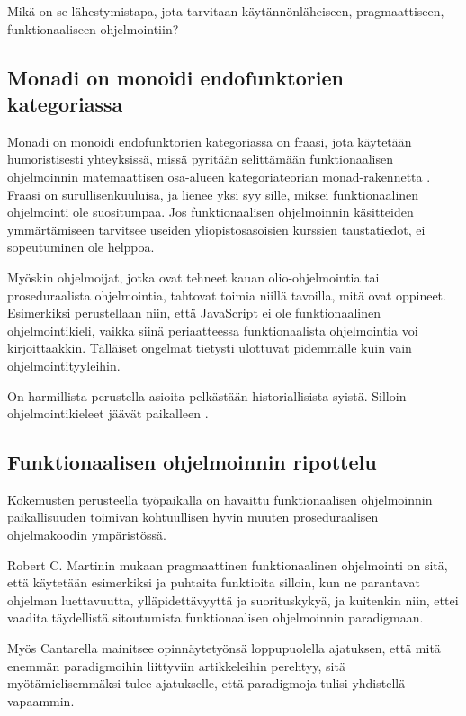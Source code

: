 Mikä on se lähestymistapa, jota tarvitaan käytännönläheiseen, pragmaattiseen, funktionaaliseen ohjelmointiin?

\subsection{Monadi on monoidi endofunktorien kategoriassa}

Monadi on monoidi endofunktorien kategoriassa on fraasi, jota käytetään humoristisesti yhteyksissä, missä pyritään selittämään funktionaalisen ohjelmoinnin matemaattisen osa-alueen kategoriateorian \gls{monad}-rakennetta \cite{bartosz_category_for_progamers_10}. Fraasi on surullisenkuuluisa, ja lienee yksi syy sille, miksei funktionaalinen ohjelmointi ole suositumpaa. Jos funktionaalisen ohjelmoinnin käsitteiden ymmärtämiseen tarvitsee useiden yliopistosasoisien kurssien taustatiedot, ei sopeutuminen ole helppoa.

Myöskin ohjelmoijat, jotka ovat tehneet kauan olio-ohjelmointia tai proseduraalista ohjelmointia, tahtovat toimia niillä tavoilla, mitä ovat oppineet. Esimerkiksi perustellaan niin, että JavaScript ei ole funktionaalinen ohjelmointikieli, vaikka siinä periaatteessa funktionaalista ohjelmointia voi kirjoittaakkin. Tälläiset ongelmat tietysti ulottuvat pidemmälle kuin vain ohjelmointityyleihin. \citep{is_reduce_bad}

On harmillista perustella asioita pelkästään historiallisista syistä. Silloin ohjelmointikieleet jäävät paikalleen \cite{promises-spec-94}.

\subsection{Funktionaalisen ohjelmoinnin ripottelu}

Kokemusten perusteella työpaikalla on havaittu funktionaalisen ohjelmoinnin paikallisuuden toimivan kohtuullisen hyvin muuten proseduraalisen ohjelmakoodin ympäristössä.

Robert C. Martinin mukaan pragmaattinen funktionaalinen ohjelmointi on sitä, että käytetään esimerkiksi  ja puhtaita funktioita silloin, kun ne parantavat ohjelman luettavuutta, ylläpidettävyyttä ja suorituskykyä, ja kuitenkin niin, ettei vaadita täydellistä sitoutumista funktionaalisen ohjelmoinnin paradigmaan. \cite{martin2017pragmaticfp}

Myös Cantarella mainitsee opinnäytetyönsä loppupuolella ajatuksen, että mitä enemmän paradigmoihin liittyviin artikkeleihin perehtyy, sitä myötämielisemmäksi tulee ajatukselle, että paradigmoja tulisi yhdistellä vapaammin. \citep[45]{cantarella_fp_haitat}

